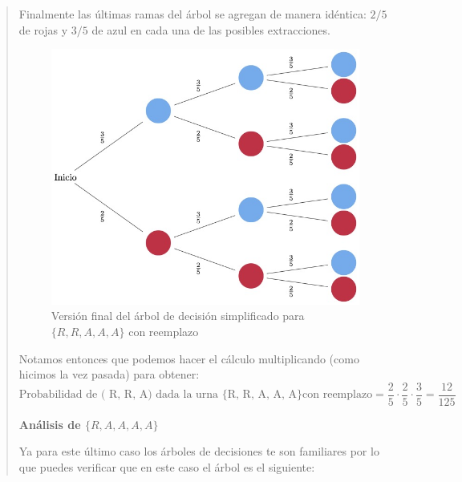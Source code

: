 \documentclass[
]{book}
\begin{document}
\begin{quote}
Finalmente las últimas ramas del árbol se agregan de manera idéntica: \(2/5\) de rojas y \(3/5\) de azul en cada una de las posibles extracciones.

\begin{figure}
\centering
\includegraphics{./images/arbol_decision_3_4.jpeg}
\caption{Versión final del árbol de decisión simplificado para \(\{ R, R, A, A, A\}\) con reemplazo}
\end{figure}

Notamos entonces que podemos hacer el cálculo multiplicando (como hicimos la vez pasada) para obtener:
\[
\textrm{Probabilidad de ( R, R, A) dada la urna \{R, R, A, A, A\} con reemplazo}  = \dfrac{2}{5} \cdot \dfrac{2}{5} \cdot \dfrac{3}{5} = \dfrac{12}{125}
\]

\textbf{Análisis de \(\{ R, A, A, A, A\}\)}

Ya para este último caso los árboles de decisiones te son familiares por lo que puedes verificar que en este caso el árbol es el siguiente:


\end{quote}
\end{document}
